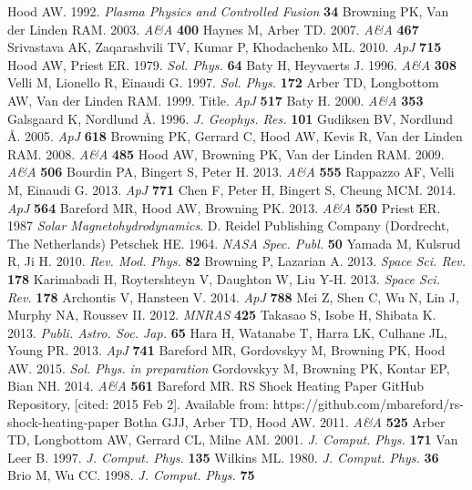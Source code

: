 \documentclass{./packages/rs/rsproca}
\begin{document}
\begin{thebibliography}{9}
 Hood AW. 1992. \textit{Plasma Physics and Controlled Fusion} \textbf{34}
 Browning PK, Van der Linden RAM. 2003. \textit{A\&A} \textbf{400}
 Haynes M, Arber TD. 2007. \textit{A\&A} \textbf{467}
 Srivastava AK, Zaqarashvili TV, Kumar P, Khodachenko ML. 2010. \textit{ApJ} \textbf{715}
 Hood AW, Priest ER. 1979. \textit{Sol. Phys.} \textbf{64}
 Baty H, Heyvaerts J. 1996. \textit{A\&A} \textbf{308}
 Velli M, Lionello R, Einaudi G. 1997. \textit{Sol. Phys.} \textbf{172}
 Arber TD, Longbottom AW, Van der Linden RAM. 1999. Title. \textit{ApJ} \textbf{517}
 Baty H. 2000. \textit{A\&A} \textbf{353}
 Galsgaard K, Nordlund \AA. 1996. \textit{J. Geophys. Res.} \textbf{101}
 Gudiksen BV, Nordlund \AA. 2005. \textit{ApJ} \textbf{618}
 Browning PK, Gerrard C, Hood AW, Kevis R, Van der Linden RAM. 2008. \textit{A\&A} \textbf{485}
 Hood AW, Browning PK, Van der Linden RAM. 2009. \textit{A\&A} \textbf{506}
 Bourdin PA, Bingert S, Peter H. 2013. \textit{A\&A} \textbf{555}
 Rappazzo AF, Velli M, Einaudi G. 2013. \textit{ApJ} \textbf{771}
 Chen F, Peter H, Bingert S, Cheung MCM. 2014. \textit{ApJ} \textbf{564}
 Bareford MR, Hood AW, Browning PK. 2013. \textit{A\&A} \textbf{550}
 Priest ER. 1987 \textit{Solar Magnetohydrodynamics}. D. Reidel Publishing Company (Dordrecht, The Netherlands)
 Petschek HE. 1964. \textit{NASA Spec. Publ.} \textbf{50}
 Yamada M, Kulsrud R, Ji H. 2010. \textit{Rev. Mod. Phys.} \textbf{82}
 Browning P, Lazarian A. 2013. \textit{Space Sci. Rev.} \textbf{178}
 Karimabadi H, Roytershteyn V, Daughton W, Liu Y-H. 2013. \textit{Space Sci. Rev.} \textbf{178}
 Archontis V, Hansteen V. 2014. \textit{ApJ} \textbf{788}
 Mei Z, Shen C, Wu N, Lin J, Murphy NA, Roussev II. 2012. \textit{MNRAS} \textbf{425}
 Takasao S, Isobe H, Shibata K. 2013. \textit{Publi. Astro. Soc. Jap.} \textbf{65}
 Hara H, Watanabe T, Harra LK, Culhane JL, Young PR. 2013. \textit{ApJ} \textbf{741}
 Bareford MR, Gordovskyy M, Browning PK, Hood AW. 2015. \textit{Sol. Phys.} \textit{in preparation}
 Gordovskyy M, Browning PK, Kontar EP, Bian NH. 2014. \textit{A\&A} \textbf{561}
 Bareford MR. RS Shock Heating Paper GitHub Repository, [cited: 2015 Feb 2]. Available from: https://github.com/mbareford/rs-shock-heating-paper
 Botha GJJ, Arber TD, Hood AW. 2011. \textit{A\&A} \textbf{525}
 Arber TD, Longbottom AW, Gerrard CL, Milne AM. 2001. \textit{J. Comput. Phys.} \textbf{171}
 Van Leer B. 1997. \textit{J. Comput. Phys.} \textbf{135}
 Wilkins ML. 1980. \textit{J. Comput. Phys.} \textbf{36}
 Brio M, Wu CC. 1998. \textit{J. Comput. Phys.} \textbf{75}


\end{thebibliography}
\end{document}

